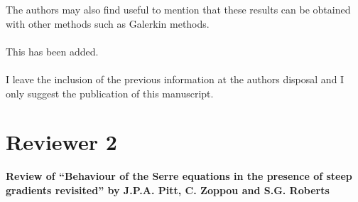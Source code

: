 \documentclass[times]{article}
\begin{document}
The authors may also find useful to mention that these results can be obtained with other methods such as Galerkin methods.
	\\ \\
	{\color{blue} This has been added. } \\ \\

I leave the inclusion of the previous information at the authors disposal and I only suggest the publication of this manuscript.
	
\section{Reviewer 2}
{\Large \textbf{Review of “Behaviour of the Serre equations in the presence of steep gradients revisited” by J.P.A. Pitt, C. Zoppou and S.G. Roberts}}
\end{document}
